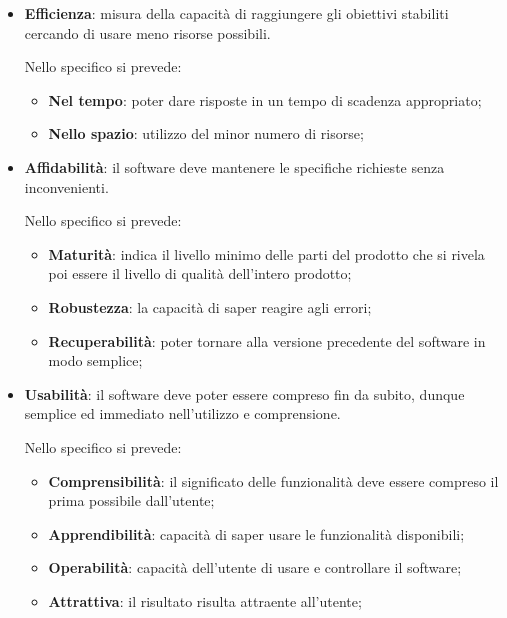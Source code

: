 \begin{itemize}
			\item \textbf{Efficienza}: misura della capacità di raggiungere gli obiettivi stabiliti cercando di usare meno risorse possibili.
			
			Nello specifico si prevede:
			
			\begin{itemize}
				\item \textbf{Nel tempo}: poter dare risposte in un tempo di scadenza appropriato;
				\item \textbf{Nello spazio}: utilizzo del minor numero di risorse; 
			\end{itemize}
		
			\item \textbf{Affidabilità}: il software deve mantenere le specifiche richieste senza inconvenienti.
			
			Nello specifico si prevede:
			
			\begin{itemize}
				\item \textbf{Maturità}: indica il livello minimo delle parti del prodotto che si rivela poi essere il livello di qualità dell'intero prodotto;
				\item \textbf{Robustezza}: la capacità di saper reagire agli errori;
				\item \textbf{Recuperabilità}: poter tornare alla versione precedente del software in modo semplice;
			\end{itemize}
		
			\item \textbf{Usabilità}: il software deve poter essere compreso fin da subito, dunque semplice ed immediato nell'utilizzo e comprensione.
			
			Nello specifico si prevede:
			
			\begin{itemize}
				\item \textbf{Comprensibilità}: il significato delle funzionalità deve essere compreso il prima possibile dall'utente;
				\item \textbf{Apprendibilità}: capacità di saper usare le funzionalità disponibili;
				\item \textbf{Operabilità}: capacità dell'utente di usare e controllare il software;
				\item \textbf{Attrattiva}: il risultato risulta attraente all'utente; 
			\end{itemize}
		\end{itemize}
	
